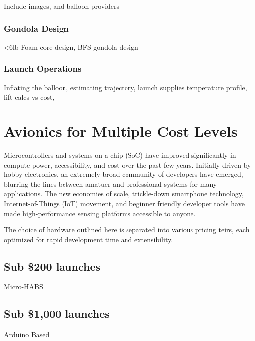 \documentclass[heading.tex]{subfiles}
\begin{document}
Include images, and balloon providers

\subsubsection{Gondola Design}

<6lb Foam core design, BFS gondola design

\subsubsection{Launch Operations}

Inflating the balloon, estimating trajectory, launch supplies
temperature profile, lift calcs vs cost, 

\section{Avionics for Multiple Cost Levels}

Microcontrollers and systems on a chip (SoC) have improved significantly in 
compute power, accessibility, and cost over the past few years.
Initially driven by hobby electronics, an extremely broad community of developers
have emerged, blurring the lines between amatuer and professional systems for
many applications. The new economies of scale, trickle-down smartphone
technology, Internet-of-Things (IoT) movement, and beginner friendly developer
tools have made high-performance sensing platforms accessible to anyone.

The choice of hardware outlined here is separated into various pricing teirs,
each optimized for rapid development time and extensibility.
\subsection{Sub \$200 launches}

Micro-HABS

\subsection{Sub \$1,000 launches}

Arduino Based
\end{document}
